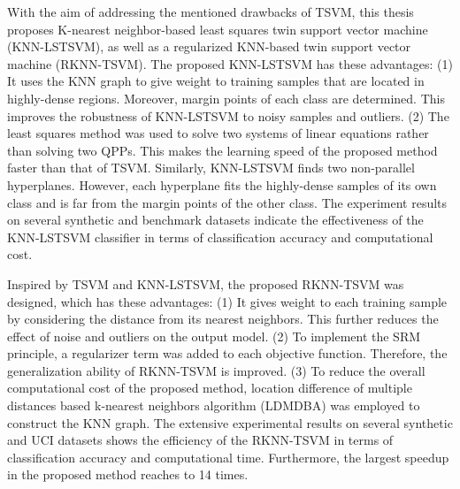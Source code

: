 \documentclass[a4paper, 12pt]{article}
\begin{document}
With the aim of addressing the mentioned drawbacks of TSVM, this thesis proposes K-nearest neighbor-based least squares twin support vector machine (KNN-LSTSVM), as well as a regularized KNN-based twin support vector machine (RKNN-TSVM). The proposed KNN-LSTSVM has these advantages: (1) It uses the KNN graph to give weight to training samples that are located in highly-dense regions. Moreover, margin points of each class are determined. This improves the robustness of KNN-LSTSVM to noisy samples and outliers. (2) The least squares method was used to solve two systems of linear equations rather than solving two QPPs. This makes the learning speed of the proposed method faster than that of TSVM. Similarly, KNN-LSTSVM finds two non-parallel hyperplanes. However, each hyperplane fits the highly-dense samples of its own class and is far from the margin points of the other class. The experiment results on several synthetic and benchmark datasets indicate the effectiveness of the KNN-LSTSVM classifier in terms of classification accuracy and computational cost.

Inspired by TSVM and KNN-LSTSVM, the proposed RKNN-TSVM was designed, which has these advantages: (1) It gives weight to each training sample by considering the distance from its nearest neighbors. This further reduces the effect of noise and outliers on the output model. (2) To implement the SRM principle, a regularizer term was added to each objective function. Therefore, the generalization ability of RKNN-TSVM is improved. (3) To reduce the overall computational cost of the proposed method, location difference of multiple distances based k-nearest neighbors algorithm (LDMDBA) was employed to construct the KNN graph. The extensive experimental results on several synthetic and UCI datasets shows the efficiency of the RKNN-TSVM in terms of classification accuracy and computational time. Furthermore, the largest speedup in the proposed method reaches to 14 times.
\end{document}
